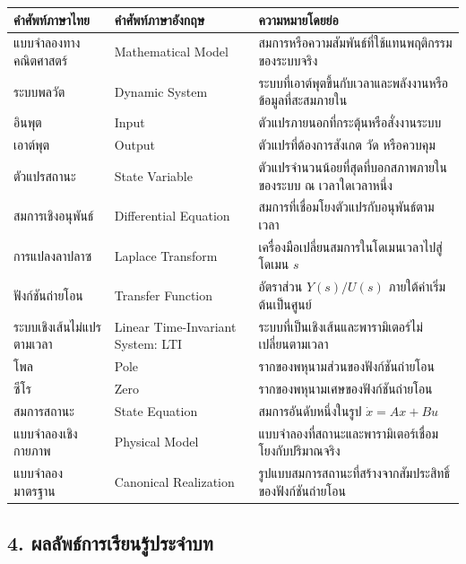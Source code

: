 \begin{table}[htbp]
    \centering
    \begin{tabular}{l l l}
        \hline
        \textbf{คำศัพท์ภาษาไทย} & \textbf{คำศัพท์ภาษาอังกฤษ} & \textbf{ความหมายโดยย่อ} \\
        \hline
        แบบจำลองทางคณิตศาสตร์ & Mathematical Model & สมการหรือความสัมพันธ์ที่ใช้แทนพฤติกรรมของระบบจริง \\
        ระบบพลวัต & Dynamic System & ระบบที่เอาต์พุตขึ้นกับเวลาและพลังงานหรือข้อมูลที่สะสมภายใน \\
        อินพุต & Input & ตัวแปรภายนอกที่กระตุ้นหรือสั่งงานระบบ \\
        เอาต์พุต & Output & ตัวแปรที่ต้องการสังเกต วัด หรือควบคุม \\
        ตัวแปรสถานะ & State Variable & ตัวแปรจำนวนน้อยที่สุดที่บอกสภาพภายในของระบบ ณ เวลาใดเวลาหนึ่ง \\
        สมการเชิงอนุพันธ์ & Differential Equation & สมการที่เชื่อมโยงตัวแปรกับอนุพันธ์ตามเวลา \\
        การแปลงลาปลาซ & Laplace Transform & เครื่องมือเปลี่ยนสมการในโดเมนเวลาไปสู่โดเมน $s$ \\
        ฟังก์ชันถ่ายโอน & Transfer Function & อัตราส่วน $Y(s)/U(s)$ ภายใต้ค่าเริ่มต้นเป็นศูนย์ \\
        ระบบเชิงเส้นไม่แปรตามเวลา & Linear Time-Invariant System: LTI & ระบบที่เป็นเชิงเส้นและพารามิเตอร์ไม่เปลี่ยนตามเวลา \\
        โพล & Pole & รากของพหุนามส่วนของฟังก์ชันถ่ายโอน \\
        ซีโร & Zero & รากของพหุนามเศษของฟังก์ชันถ่ายโอน \\
        สมการสถานะ & State Equation & สมการอันดับหนึ่งในรูป $\dot{x}=Ax+Bu$ \\
        แบบจำลองเชิงกายภาพ & Physical Model & แบบจำลองที่สถานะและพารามิเตอร์เชื่อมโยงกับปริมาณจริง \\
        แบบจำลองมาตรฐาน & Canonical Realization & รูปแบบสมการสถานะที่สร้างจากสัมประสิทธิ์ของฟังก์ชันถ่ายโอน \\
        \hline
    \end{tabular}
\end{table}


\subsection{4. ผลลัพธ์การเรียนรู้ประจำบท}

